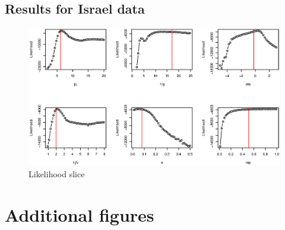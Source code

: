 \clearpage

\subsection{Results for Israel data}


\begin{figure}[htb]
  \center
    \includegraphics[width= 0.9 \linewidth]{texte/article2/graph_annexe/slice_israel.eps}
    \caption{Likelihood slice}
  \label{fig:israel}
\end{figure}





\section{Additional figures}



